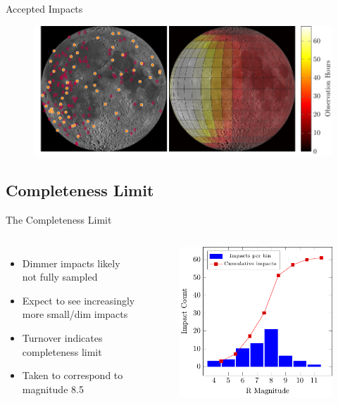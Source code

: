\documentclass[pdf]{beamer}
\begin{document}
 \begin{frame}{Accepted Impacts}
   \begin{figure}[ht!]
	 \centering
	 \includegraphics[width=1.05\textwidth]{Images/Impacts_and_Bias.pdf}
   \end{figure}
 \end{frame}

 \subsection{Completeness Limit}

 \begin{frame}{The Completeness Limit}
   \begin{columns}
	 \begin{itemize}
	   \item Dimmer impacts likely not fully sampled
	   \item Expect to see increasingly more small/dim impacts
	   \item Turnover indicates completeness limit
	   \item Taken to correspond to magnitude 8.5
	 \end{itemize}
	 \begin{figure}[ht!]
	   \centering
	   \includegraphics[width=\textwidth]{Images/RMagHist.pdf}
	 \end{figure}
   \end{columns}
 \end{frame}
\end{document}
